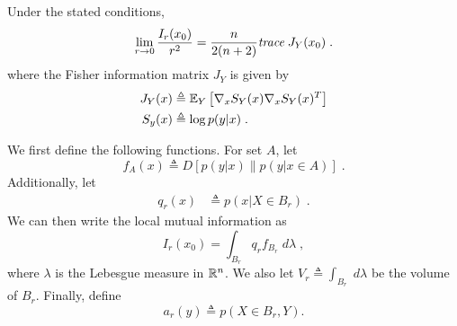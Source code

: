 		\begin{thm} \label{thm1}
			Under the stated conditions, 
			\begin{equation}
				\lim_{r\rightarrow 0} \frac{I_r(x_0)}{r^2} = \frac{n}{2(n+2)} \emph{trace}\; J_Y(x_0)\;.
			\end{equation}
			where the Fisher information matrix $J_Y$ is given by 
			\begin{align}
			J_Y(x) &\triangleq \mathbb{E}_Y\left[\nabla_x S_{Y}(x)\nabla_x S_{Y}(x)^T \right] \\
			S_y(x) &\triangleq \log p(y|x)\;.
		\end{align}
		\end{thm}

	We first define the following functions. For set $A$, let 
	\begin{equation}
		f_A(x) \triangleq  D[p(y|x) \| p(y|x\in A)] \;.
	\end{equation}
	Additionally, let 
	\begin{align}
		q_r(x) &\triangleq p(x|X \in B_r)\;.
	\end{align}
	We can then write the local mutual information as 
	\begin{equation}
		I_r(x_0) = \int_{B_r} q_r f_{B_r} \; d\lambda\;,
	\end{equation}
	where $\lambda$ is the Lebesgue measure in $\mathbb{R}^n$. We also let $V_r \triangleq \int_{B_r} \; d\lambda$ be the volume of $B_r$. Finally, define 
	\begin{equation}
		a_r(y) \triangleq p(X \in B_r, Y). 
	\end{equation}

